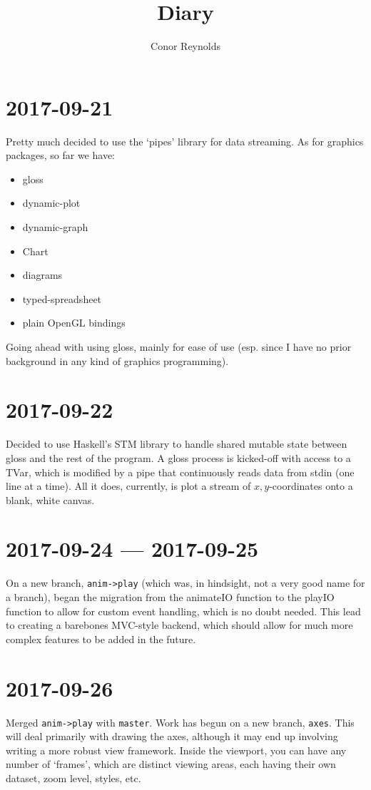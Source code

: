 \documentclass[a5paper,10pt]{article}
\title{Diary}
\author{Conor Reynolds}
\date{}
\begin{document}
	\maketitle
	
	\section*{2017-09-21}
	
	Pretty much decided to use the `pipes' library for data streaming. As for graphics packages, so far we have:
	
	\begin{itemize}
		\item gloss
		\item dynamic-plot
		\item dynamic-graph
		\item Chart
		\item diagrams
		\item typed-spreadsheet
		\item plain OpenGL bindings
	\end{itemize}
	
	Going ahead with using gloss, mainly for ease of use (esp. since I have no prior background in any kind of graphics programming).
	
	\section*{2017-09-22}
	
	Decided to use Haskell's STM library to handle shared mutable state between gloss and the rest of the program. A gloss process is kicked-off with access to a TVar, which is modified by a pipe that continuously reads data from stdin (one line at a time). All it does, currently, is plot a stream of $ x,y $-coordinates onto a blank, white canvas.
	
	\section*{2017-09-24 --- 2017-09-25}
	
	On a new branch, \verb|anim->play| (which was, in hindsight, not a very good name for a branch), began the migration from the animateIO function to the playIO function to allow for custom event handling, which is no doubt needed. This lead to creating a barebones MVC-style backend, which should allow for much more complex features to be added in the future.
	
	\section*{2017-09-26}
	
	Merged \verb|anim->play| with \verb|master|. Work has begun on a new branch, \verb|axes|. This will deal primarily with drawing the axes, although it may end up involving writing a more robust view framework. Inside the viewport, you can have any number of `frames', which are distinct viewing areas, each having their own dataset, zoom level, styles, etc.
	
\end{document}

